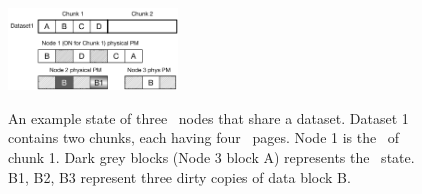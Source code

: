 {
\begin{figure}[th]
\begin{center}
\centerline{\includegraphics[width=0.4\textwidth]{Figures/dataset.pdf}}
{
An example state of three \hotpot\ nodes that share a dataset.
Dataset 1 contains two chunks, each having four \nvm\ pages.
Node 1 is the \on\ of chunk 1.
Dark grey blocks (Node 3 block A) represents the \redundant\ state.
B1, B2, B3 represent three dirty copies of data block B.
}
\end{center}
\end{figure}
}
